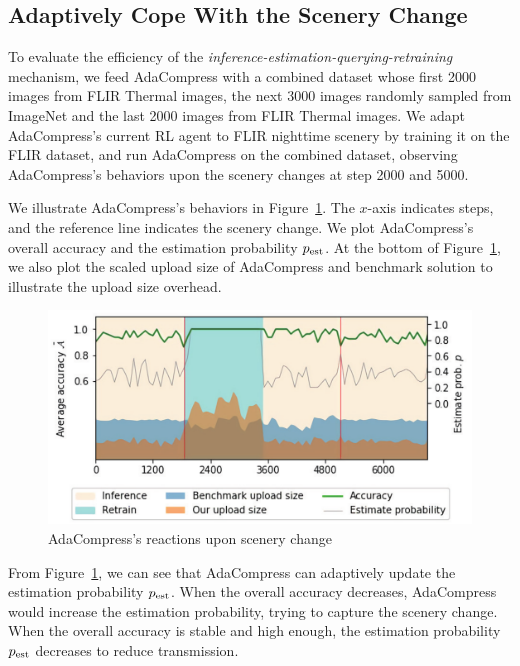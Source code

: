 \subsection{Adaptively Cope With the Scenery Change}

To evaluate the efficiency of the \emph{inference-estimation-querying-retraining} mechanism, we feed AdaCompress with a combined dataset whose first 2000 images from FLIR Thermal images, the next 3000 images randomly sampled from ImageNet and the last 2000 images from FLIR Thermal images. We adapt AdaCompress's current RL agent to FLIR nighttime scenery by training it on the FLIR dataset, and run AdaCompress on the combined dataset, observing AdaCompress's behaviors upon the scenery changes at step 2000 and 5000. %

We illustrate AdaCompress's behaviors in Figure~\ref{fig: running-retrain}. The $ x $-axis indicates steps, and the reference line indicates the scenery change. We plot AdaCompress's overall accuracy and the estimation probability $ p_{\rm est} $. At the bottom of Figure~\ref{fig: running-retrain}, we also plot the scaled upload size of AdaCompress and benchmark solution to illustrate the upload size overhead.

\begin{figure}[!t]
	\includegraphics[width=0.8\linewidth]{figures/running-retrain.pdf}
	\caption{AdaCompress's reactions upon scenery change}
	\label{fig: running-retrain}
\end{figure}

From Figure~\ref{fig: running-retrain}, we can see that AdaCompress can adaptively update the estimation probability $ p_{\rm est} $. When the overall accuracy decreases, AdaCompress would increase the estimation probability, trying to capture the scenery change. When the overall accuracy is stable and high enough, the estimation probability $ p_{\rm est} $ decreases to reduce transmission. %

